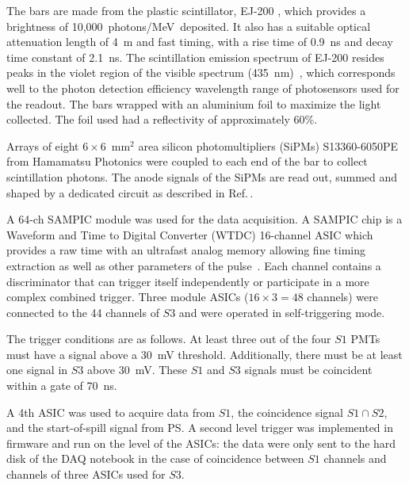 The bars are made from the plastic scintillator, EJ-200 \cite{SCIONIX}, which provides a brightness of 10,000~photons/MeV~deposited.
It also has a suitable optical attenuation length of 4~m and fast timing, with a rise time of 0.9~ns and decay time constant of 2.1~ns.
The scintillation emission spectrum of EJ-200 resides peaks in the violet region of the visible spectrum (435~nm)~\cite{EJ200}, which corresponds well to the photon detection efficiency wavelength range of photosensors used for the readout.
The bars wrapped with an aluminium foil to maximize the light collected.
The foil used had a reflectivity of approximately 60\%.

Arrays of eight $6 \times 6$~mm$^2$ area silicon photomultipliers (SiPMs) S13360-6050PE from Hamamatsu Photonics \cite{Hamamatsu} were coupled to each end of the bar to collect scintillation photons.
The anode signals of the SiPMs are read out, summed and shaped by a dedicated circuit as described in Ref.\,\cite{S3-readout}.

A 64-ch SAMPIC  module was used for the data acquisition.
A SAMPIC chip is a Waveform and Time to Digital Converter (WTDC) 16-channel ASIC which provides a raw time with an ultrafast analog memory allowing fine timing extraction as well as other parameters of the pulse~\cite{SAMPIC}.
Each channel contains a discriminator that can trigger itself independently or participate in a more complex combined trigger. 
Three module ASICs ($16\times3=48$ channels) were connected to the 44 channels of $\mathit{S3}$ and were operated in self-triggering mode.

The trigger conditions are as follows. At least three out of the four $\mathit{S1}$ PMTs must have a signal above a 30~mV threshold.
Additionally, there must be at least one signal in $\mathit{S3}$ above 30~mV.
These $\mathit{S1}$ and $\mathit{S3}$ signals must be coincident within a gate of 70~ns.

A 4th ASIC was used to acquire data from $\mathit{S1}$, the coincidence signal $\mathit{S1} \cap \mathit{S2}$, and the start-of-spill signal from PS.
A second level trigger was implemented in firmware and run on the level of the ASICs: the data were only sent to the hard disk of the DAQ notebook in the case of coincidence between $\mathit{S1}$ channels and channels of three ASICs used for $\mathit{S3}$.

